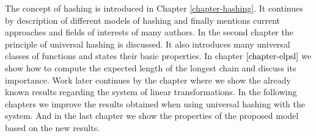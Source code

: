 The concept of hashing is introduced in Chapter \ref{chapter-hashing}. It continues by description of different models of hashing and finally mentions current approaches and fields of interests of many authors.
In the second chapter the principle of universal hashing is discussed. It also introduces many universal classes of functions and states their basic properties.
In chapter $\ref{chapter-elpsl}$ we show how to compute the expected length of the longest chain and discuss its importance.
Work later continues by the chapter where we show the already known results regarding the system of linear transformations. In the following chapters we improve the results obtained when using universal hashing with the system. And in the last chapter we show the properties of the proposed model based on the new results.

